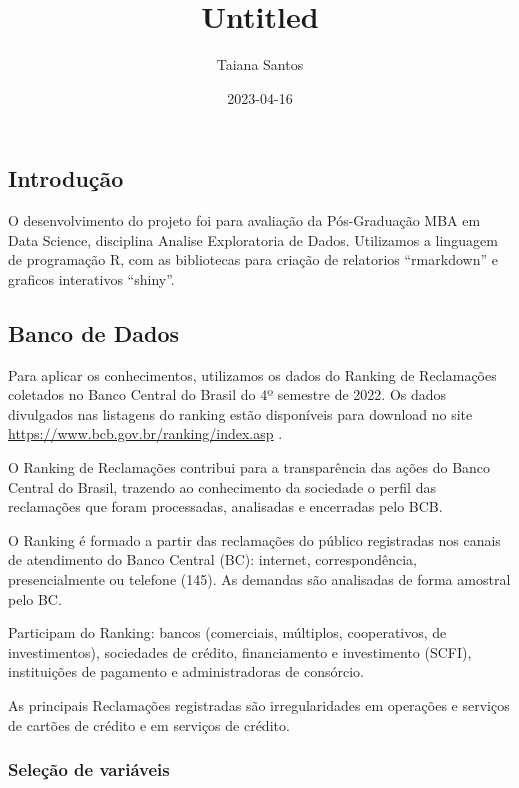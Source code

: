 \documentclass[
]{article}
\title{Untitled}
\author{Taiana Santos}
\date{2023-04-16}
\begin{document}
\maketitle

\hypertarget{introduuxe7uxe3o}{%
\subsection{Introdução}\label{introduuxe7uxe3o}}

O desenvolvimento do projeto foi para avaliação da Pós-Graduação MBA em
Data Science, disciplina Analise Exploratoria de Dados. Utilizamos a
linguagem de programação R, com as bibliotecas para criação de
relatorios ``rmarkdown'' e graficos interativos ``shiny''.

\hypertarget{banco-de-dados}{%
\subsection{Banco de Dados}\label{banco-de-dados}}

Para aplicar os conhecimentos, utilizamos os dados do Ranking de
Reclamações coletados no Banco Central do Brasil do 4º semestre de 2022.
Os dados divulgados nas listagens do ranking estão disponíveis para
download no site \url{https://www.bcb.gov.br/ranking/index.asp} .

O Ranking de Reclamações contribui para a transparência das ações do
Banco Central do Brasil, trazendo ao conhecimento da sociedade o perfil
das reclamações que foram processadas, analisadas e encerradas pelo BCB.

O Ranking é formado a partir das reclamações do público registradas nos
canais de atendimento do Banco Central (BC): internet, correspondência,
presencialmente ou telefone (145). As demandas são analisadas de forma
amostral pelo BC.

Participam do Ranking: bancos (comerciais, múltiplos, cooperativos, de
investimentos), sociedades de crédito, financiamento e investimento
(SCFI), instituições de pagamento e administradoras de consórcio.

As principais Reclamações registradas são irregularidades em operações e
serviços de cartões de crédito e em serviços de crédito.

\hypertarget{seleuxe7uxe3o-de-variuxe1veis}{%
\subsubsection{Seleção de
variáveis}\label{seleuxe7uxe3o-de-variuxe1veis}}
\end{document}
